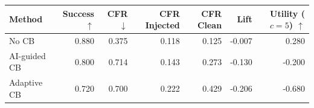 \begin{tabular}{lrrrrrr}
\toprule
Method & Success $\uparrow$ & CFR $\downarrow$ & CFR Injected & CFR Clean & Lift & Utility ($c=5$) $\uparrow$ \\
\midrule
No CB & 0.880 & 0.375 & 0.118 & 0.125 & -0.007 & 0.280 \\
AI-guided CB & 0.800 & 0.714 & 0.143 & 0.273 & -0.130 & -0.200 \\
Adaptive CB & 0.720 & 0.700 & 0.222 & 0.429 & -0.206 & -0.680 \\
\bottomrule
\end{tabular}
